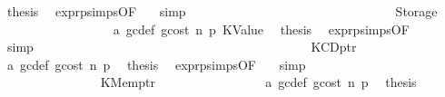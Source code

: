 \begin{isabellebody}
\ {\isacharquery}{\kern0pt}thesis\ \isamarkupfalse%
\ expr{\isachardot}{\kern0pt}psimps{\isacharparenleft}{\kern0pt}{}{}{\isacharparenright}{\kern0pt}{\isacharbrackleft}{\kern0pt}OF\ {}{}{\isacharparenleft}{\kern0pt}{}{\isacharparenright}{\kern0pt}{\isacharbrackright}{\kern0pt}\ \isamarkupfalse%
\ simp\isanewline
\ \ \ \ \ \ \ \ \ \ \ \ \ \ \isamarkupfalse%
\isanewline
\ \ \ \ \ \ \ \ \ \ \ \ \ \ \ \ \isamarkupfalse%
\ {\isacharparenleft}{\kern0pt}Storage\ {\isacharunderscore}{\kern0pt}{\isacharparenright}{\kern0pt}\isanewline
\ \ \ \ \ \ \ \ \ \ \ \ \ \ \ \ \isamarkupfalse%
\ a{}\ gc{\isacharunderscore}{\kern0pt}def\ gcost\ n\ p{}\ KValue\ \isamarkupfalse%
\ {\isacharquery}{\kern0pt}thesis\ \isamarkupfalse%
\ expr{\isachardot}{\kern0pt}psimps{\isacharparenleft}{\kern0pt}{}{}{\isacharparenright}{\kern0pt}{\isacharbrackleft}{\kern0pt}OF\ {}{}{\isacharparenleft}{\kern0pt}{}{\isacharparenright}{\kern0pt}{\isacharbrackright}{\kern0pt}\ \isamarkupfalse%
\ simp\isanewline
\ \ \ \ \ \ \ \ \ \ \ \ \ \ \isamarkupfalse%
\isanewline
\ \ \ \ \ \ \ \ \ \ \ \ \isamarkupfalse%
\isanewline
\ \ \ \ \ \ \ \ \ \ \ \ \ \ \isamarkupfalse%
\ {\isacharparenleft}{\kern0pt}KCDptr\ {\isacharunderscore}{\kern0pt}{\isacharparenright}{\kern0pt}\isanewline
\ \ \ \ \ \ \ \ \ \ \ \ \ \ \isamarkupfalse%
\ a{}\ gc{\isacharunderscore}{\kern0pt}def\ gcost\ n\ p{}\ \isamarkupfalse%
\ {\isacharquery}{\kern0pt}thesis\ \isamarkupfalse%
\ expr{\isachardot}{\kern0pt}psimps{\isacharparenleft}{\kern0pt}{}{}{\isacharparenright}{\kern0pt}{\isacharbrackleft}{\kern0pt}OF\ {}{}{\isacharparenleft}{\kern0pt}{}{\isacharparenright}{\kern0pt}{\isacharbrackright}{\kern0pt}\ \isamarkupfalse%
\ simp\isanewline
\ \ \ \ \ \ \ \ \ \ \ \ \isamarkupfalse%
\isanewline
\ \ \ \ \ \ \ \ \ \ \ \ \ \ \isamarkupfalse%
\ {\isacharparenleft}{\kern0pt}KMemptr\ {\isacharunderscore}{\kern0pt}{\isacharparenright}{\kern0pt}\isanewline
\ \ \ \ \ \ \ \ \ \ \ \ \ \ \isamarkupfalse%
\ a{}\ gc{\isacharunderscore}{\kern0pt}def\ gcost\ n\ p{}\ \isamarkupfalse%
\ {\isacharquery}{\kern0pt}thesis\ \isamarkupfalse%

\end{isabellebody}
